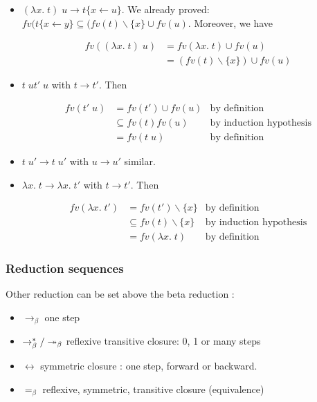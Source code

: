   \begin{itemize}
    \item $(\lambda x.\;t)\;u \to t\{x \leftarrow u\}$. We already proved:
      $fv(t\{x \leftarrow y\} \subseteq (fv(t) \backslash \{x\} \cup fv(u)$.
      Moreover, we have

      \begin{align*}
        fv((\lambda x.\;t)\;u) &= fv(\lambda x.\;t) \cup fv(u) \\
            &= (fv(t)\backslash \{x\}) \cup fv(u)
      \end{align*}
    \item $t\;u t'\; u$ with $t \to t'$. Then

      \begin{align*}
        fv(t'\;u) &= fv(t') \cup fv(u) & \text{by definition} \\
        &\subseteq fv(t) fv(u) & \text{by induction hypothesis} \\
        &= fv(t\; u) & \text{by definition}
      \end{align*}

    \item $t\; u' \to t\; u'$ with $u \to u'$ similar.

    \item $\lambda x.\;t \to \lambda x.\; t'$ with $t\to t'$. Then

      \begin{align*}
        fv(\lambda x.\; t') &= fv(t')\backslash\{x\} & \text{by definition} \\
        &\subseteq fv(t) \backslash \{x\} & \text{by induction hypothesis} \\
        &= fv(\lambda x.\; t) & \text{by definition}
      \end{align*}
  \end{itemize}
  \qedsymbol

  \subsubsection{Reduction sequences}

  Other reduction can be set above the beta reduction :

  \begin{itemize}
    \item $\to_\beta$ one step
    \item $\to_\beta^* / \twoheadrightarrow_\beta$ reflexive transitive closure: 0, 1 or many steps
    \item $\leftrightarrow$ symmetric closure : one step, forward or backward.
    \item $=_\beta$ reflexive, symmetric, transitive closure (equivalence)
  \end{itemize}

